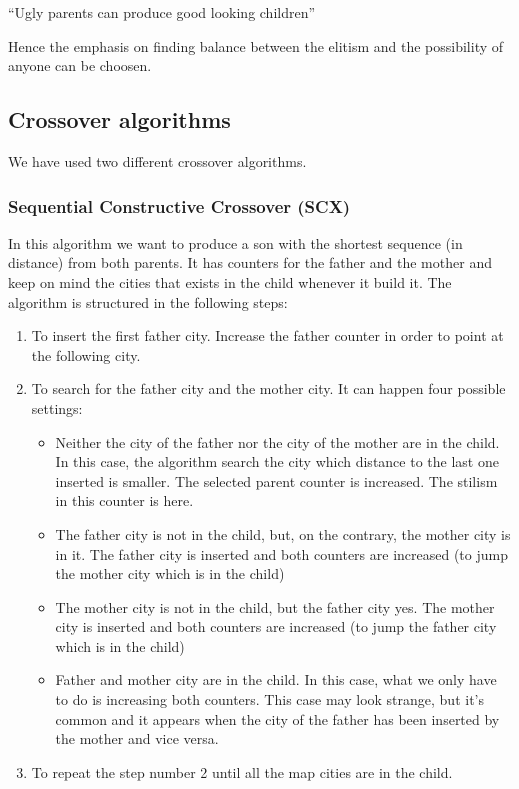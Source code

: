 \documentclass{article}
\begin{document}
    \hspace{5mm}“Ugly parents can produce good looking children”
    
    Hence the emphasis on finding balance between the elitism and the possibility of anyone can be choosen.

\subsection{Crossover algorithms}
We have used two different crossover algorithms.
\subsubsection{Sequential Constructive Crossover (SCX)}
In this algorithm we want to produce a son with the shortest sequence (in distance) from both parents. It has counters for the father and 
the mother and keep on mind the cities that exists in the child whenever it build it. The algorithm is structured in the following steps:
\begin{enumerate}
    \item To insert the first father city. Increase the father counter in order to point at the following city.
    \item To search for the father city and the mother city. It can happen four possible settings:
        \begin{itemize}
            \item Neither the city of the father nor the city of the mother are in the child. In this case,  the algorithm search the city which 
            distance to the last one inserted is smaller. The selected parent counter is increased. The stilism in this counter is here.
            \item The father city is not in the child, but, on the contrary, the mother city is in it. The father city is inserted and both 
            counters are increased (to jump the mother city which is in the child)
            \item The mother city is not in the child, but the father city yes. The mother city is inserted and both counters are increased 
            (to jump the father city which is in the child)
            \item Father and mother city are in the child. In this case, what we only have to do is increasing both counters.
            This case may look strange, but it's common and it appears when the city of the father has been inserted by the mother and 
            vice versa.
        \end{itemize}
    
    \item To repeat the step number 2 until all the map cities are in the child.
\end{enumerate}
\end{document}
